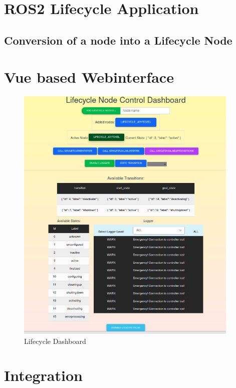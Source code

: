 \section{ROS2 Lifecycle Application}
\label{Implementierung:ROS2LifecycleApplication}

\subsection{Conversion of a node into a Lifecycle Node}

\section{Vue based Webinterface}
\label{Implementierung:VueBasedWebinterface}

\begin{figure}[H]
	\centering
	\includegraphics[width=0.95\textwidth]{"Bilder/lifecycle-dashboard.png"}
	\caption{Lifecycle Dashboard}
	\label{fig:Background:LifecycleDashboard}					
\end{figure}

\section{Integration}
\label{Implementierung:Integration}


	
		
		
	
	